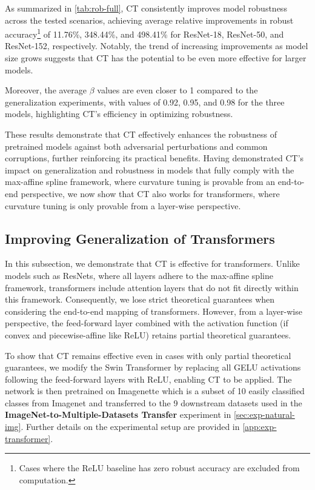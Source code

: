 As summarized in \cref{tab:rob-full}, CT consistently improves model robustness across the tested scenarios, achieving average relative improvements in robust accuracy\footnote{Cases where the ReLU baseline has zero robust accuracy are excluded from computation.} of 11.76\%, 348.44\%, and 498.41\% for ResNet-18, ResNet-50, and ResNet-152, respectively. Notably, the trend of increasing improvements as model size grows suggests that CT has the potential to be even more effective for larger models.

Moreover, the average $\beta$ values are even closer to 1 compared to the generalization experiments, with values of 0.92, 0.95, and 0.98 for the three models, highlighting CT’s efficiency in optimizing robustness.

These results demonstrate that CT effectively enhances the robustness of pretrained models against both adversarial perturbations and common corruptions, further reinforcing its practical benefits. Having demonstrated CT's impact on generalization and robustness in models that fully comply with the max-affine spline framework, where curvature tuning is provable from an end-to-end perspective, we now show that CT also works for transformers, where curvature tuning is only provable from a layer-wise perspective.



\subsection{Improving Generalization of Transformers}\label{sec:exp-transformer}
In this subsection, we demonstrate that CT is effective for transformers. Unlike models such as ResNets, where all layers adhere to the max-affine spline framework, transformers include attention layers that do not fit directly within this framework. Consequently, we lose strict theoretical guarantees when considering the end-to-end mapping of transformers. However, from a layer-wise perspective, the feed-forward layer combined with the activation function (if convex and piecewise-affine like ReLU) retains partial theoretical guarantees.  

To show that CT remains effective even in cases with only partial theoretical guarantees, we modify the Swin Transformer \cite{liu2021swin} by replacing all GELU activations following the feed-forward layers with ReLU, enabling CT to be applied. The network is then pretrained on Imagenette \cite{imagenette} which is a subset of 10 easily classified classes from Imagenet and transferred to the 9 downstream datasets used in the \textbf{ImageNet-to-Multiple-Datasets Transfer} experiment in \cref{sec:exp-natural-img}. Further details on the experimental setup are provided in \cref{app:exp-transformer}.  

